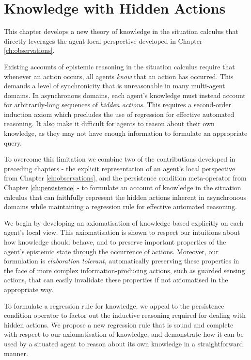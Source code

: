 

\chapter{Knowledge with Hidden Actions}

\label{ch:knowledge}

This chapter develops a new theory of knowledge in the situation calculus
that directly leverages the agent-local perspective developed in Chapter
\ref{ch:observations}.

Existing accounts of epistemic reasoning in the situation calculus
require that whenever an action occurs, all agents \emph{know} that
an action has occurred. This demands a level of synchronicity that
is unreasonable in many multi-agent domains. In asynchronous domains,
each agent's knowledge must instead account for arbitrarily-long sequences
of \emph{hidden actions}. This requires a second-order induction axiom
which precludes the use of regression for effective automated reasoning.
It also make it difficult for agents to reason about their own knowledge,
as they may not have enough information to formulate an appropriate
query.

To overcome this limitation we combine two of the contributions developed
in preceding chapters - the explicit representation of an agent's
local perspective from Chapter \ref{ch:observations}, and the persistence
condition meta-operator from Chapter \ref{ch:persistence} - to formulate
an account of knowledge in the situation calculus that can faithfully
represent the hidden actions inherent in asynchronous domains while
maintaining a regression rule for effective automated reasoning.

We begin by developing an axiomatisation of knowledge based explicitly
on each agent's local view. This axiomatisation is shown to respect
our intuitions about how knowledge should behave, and to preserve
important properties of the agent's epistemic state through the occurrence
of actions. Moreover, our formulation is \emph{elaboration tolerant},
automatically preserving these properties in the face of more complex
information-producing actions, such as guarded sensing actions, that
can easily invalidate these properties if not axiomatised in the appropriate
way.

To formulate a regression rule for knowledge, we appeal to the persistence
condition operator to factor out the inductive reasoning required
for dealing with hidden actions. We propose a new regression rule
that is sound and complete with respect to our axiomatisation of knowledge,
and demonstrate how it can be used by a situated agent to reason about
its own knowledge in a straightforward manner.

